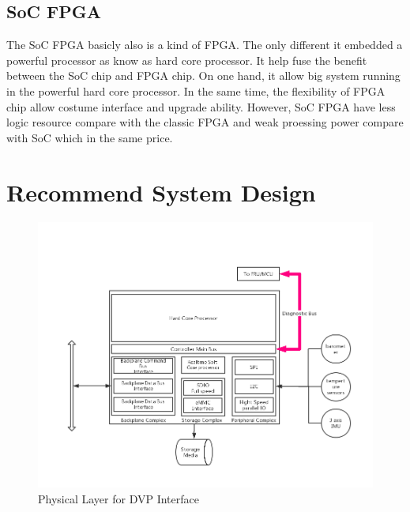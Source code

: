 \documentclass[12pt,article]{memoir}
\begin{document}
\section{SoC FPGA}
The SoC FPGA basicly also is a kind of FPGA. The only different it embedded a powerful processor as know as hard core processor. It help fuse the benefit between the SoC chip and FPGA chip. On one hand, it allow big system running in the powerful hard core processor. In the same time, the flexibility of FPGA chip allow costume interface and upgrade ability. However, SoC FPGA have less logic resource compare with the classic FPGA and weak proessing power compare with SoC which in the same price.
\newpage
\chapter{Recommend System Design}
\begin{figure}[htp]
\includegraphics[width=\textwidth]{DR00003_Plan1.png}
 \caption{Physical Layer for DVP Interface}	
\end{figure}
\end{document}
